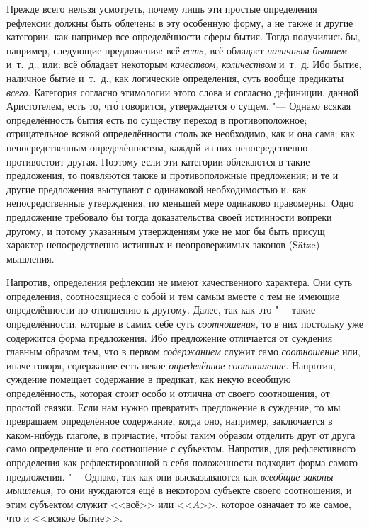 Прежде всего нельзя усмотреть, почему лишь эти простые определения рефлексии
должны быть облечены в эту особенную форму, а не также и другие категории,
как например все определённости сферы бытия. Тогда получились бы, например,
следующие предложения: всё {\em есть,} всё обладает
{\em наличным бытием} и~т.~д.; или: всё обладает некоторым {\em качеством,}
{\em количеством} и~т.~д. Ибо бытие, наличное бытие
и~т.~д., как логические определения, суть вообще предикаты
{\em всего}. Категория согласно этимологии этого слова
и согласно дефиниции, данной Аристотелем, есть то, чт\'{о} говорится,
утверждается о сущем. "--- Однако всякая определённость бытия есть по существу
переход в противоположное; отрицательное всякой определённости столь же
необходимо, как и она сама; как непосредственным определённостям, каждой из
них непосредственно противостоит другая. Поэтому если эти категории
облекаются в такие предложения, то появляются также и противоположные
предложения; и те и другие предложения выступают с одинаковой
необходимостью и, как непосредственные утверждения, по меньшей мере
одинаково правомерны. Одно предложение требовало бы тогда доказательства
своей истинности вопреки другому, и потому указанным утверждениям уже не
мог бы быть присущ характер непосредственно истинных и неопровержимых
законов (Sätze) мышления.

Напротив, определения рефлексии не имеют качественного характера. Они суть
определения, соотносящиеся с собой и тем самым вместе с тем не имеющие
определённости по отношению к другому. Далее, так как это "--- такие
определённости, которые в самих себе суть
{\em соотношения,} то в них постольку уже содержится
форма предложения. Ибо предложение отличается от суждения главным образом
тем, что в первом {\em содержанием} служит само
{\em соотношение} или, иначе говоря, содержание есть
некое {\em определённое соотношение}. Напротив,
суждение помещает содержание в предикат, как некую всеобщую определённость,
которая стоит особо и отлична от своего соотношения, от простой связки.
Если нам нужно превратить предложение в суждение, то мы превращаем
определённое содержание, когда оно, например, заключается в каком-нибудь
глаголе, в причастие, чтобы таким образом отделить друг от друга само
определение и его соотношение с субъектом. Напротив, для рефлективного
определения как рефлектированной в себя положенности подходит форма самого
предложения. "--- Однако, так как они высказываются как
{\em всеобщие законы мышления,} то они нуждаются ещё в
некотором субъекте своего соотношения, и этим субъектом служит <<всё>> или
<<$A$>>, которое означает то же самое, что и <<всякое бытие>>.

